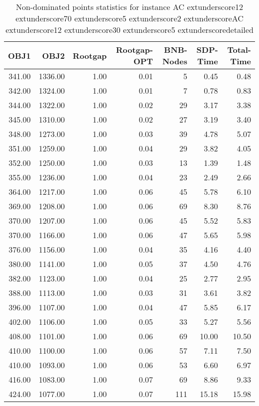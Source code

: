 \begin{table}
\caption{Non-dominated points statistics for instance AC	extunderscore12	extunderscore70	extunderscore5	extunderscore2	extunderscoreAC	extunderscore12	extunderscore30	extunderscore5	extunderscoredetailed}
\label{tab:plots/AC_12_70_5_2_AC_12_30_5_detailed}
\begin{tabular}{rrrrrrr}
\toprule
OBJ1 & OBJ2 & Rootgap & Rootgap-OPT & BNB-Nodes & SDP-Time & Total-Time \\
\midrule
341.00 & 1336.00 & 1.00 & 0.01 & 5 & 0.45 & 0.48 \\
342.00 & 1324.00 & 1.00 & 0.01 & 7 & 0.78 & 0.83 \\
344.00 & 1322.00 & 1.00 & 0.02 & 29 & 3.17 & 3.38 \\
345.00 & 1310.00 & 1.00 & 0.02 & 27 & 3.19 & 3.40 \\
348.00 & 1273.00 & 1.00 & 0.03 & 39 & 4.78 & 5.07 \\
351.00 & 1259.00 & 1.00 & 0.04 & 29 & 3.82 & 4.05 \\
352.00 & 1250.00 & 1.00 & 0.03 & 13 & 1.39 & 1.48 \\
355.00 & 1236.00 & 1.00 & 0.04 & 23 & 2.49 & 2.66 \\
364.00 & 1217.00 & 1.00 & 0.06 & 45 & 5.78 & 6.10 \\
369.00 & 1208.00 & 1.00 & 0.06 & 69 & 8.30 & 8.76 \\
370.00 & 1207.00 & 1.00 & 0.06 & 45 & 5.52 & 5.83 \\
370.00 & 1166.00 & 1.00 & 0.06 & 47 & 5.65 & 5.98 \\
376.00 & 1156.00 & 1.00 & 0.04 & 35 & 4.16 & 4.40 \\
380.00 & 1141.00 & 1.00 & 0.05 & 37 & 4.50 & 4.76 \\
382.00 & 1123.00 & 1.00 & 0.04 & 25 & 2.77 & 2.95 \\
388.00 & 1113.00 & 1.00 & 0.03 & 31 & 3.61 & 3.82 \\
396.00 & 1107.00 & 1.00 & 0.04 & 47 & 5.85 & 6.17 \\
402.00 & 1106.00 & 1.00 & 0.05 & 33 & 5.27 & 5.56 \\
408.00 & 1101.00 & 1.00 & 0.06 & 69 & 10.00 & 10.50 \\
410.00 & 1100.00 & 1.00 & 0.06 & 57 & 7.11 & 7.50 \\
410.00 & 1093.00 & 1.00 & 0.06 & 53 & 6.60 & 6.97 \\
416.00 & 1083.00 & 1.00 & 0.07 & 69 & 8.86 & 9.33 \\
424.00 & 1077.00 & 1.00 & 0.07 & 111 & 15.18 & 15.98 \\

\end{tabular}
\end{table}
